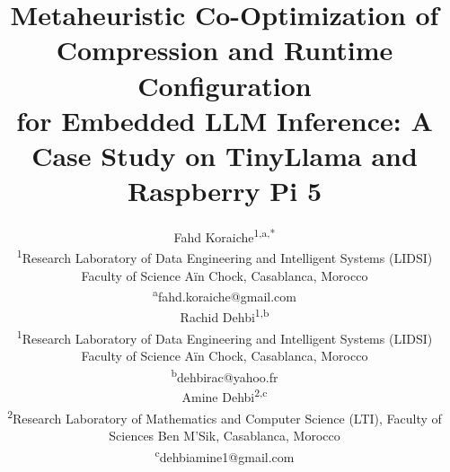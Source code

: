 \documentclass[journal]{IEEEtran}
\begin{document}
\title{Metaheuristic Co-Optimization of Compression and Runtime Configuration\\
for Embedded LLM Inference: A Case Study on TinyLlama and Raspberry Pi 5}

\author{
\begin{minipage}[t]{0.27\textwidth}
\centering
{\large Fahd Koraiche\textsuperscript{1,a,*}}\\[4pt]
\small
\textsuperscript{1}Research Laboratory of Data Engineering and Intelligent Systems (LIDSI)\\
Faculty of Science A\"{i}n Chock, Casablanca, Morocco\\
\textsuperscript{a}fahd.koraiche@gmail.com
\end{minipage}%
\hspace{0.03\textwidth}\hfill
\begin{minipage}[t]{0.27\textwidth}
\centering
{\large Rachid Dehbi\textsuperscript{1,b}}\\[4pt]
\small
\textsuperscript{1}Research Laboratory of Data Engineering and Intelligent Systems (LIDSI)\\
Faculty of Science A\"{i}n Chock, Casablanca, Morocco\\
\textsuperscript{b}dehbirac@yahoo.fr
\end{minipage}%
\hfill\hspace{0.03\textwidth}\hfill
\begin{minipage}[t]{0.27\textwidth}
\centering
{\large Amine Dehbi\textsuperscript{2,c}}\\[4pt]
\small
\textsuperscript{2}Research Laboratory of Mathematics and Computer Science (LTI), Faculty of Sciences Ben M'Sik, Casablanca, Morocco\\
\textsuperscript{c}dehbiamine1@gmail.com
\end{minipage}
}

\maketitle
\end{document}
